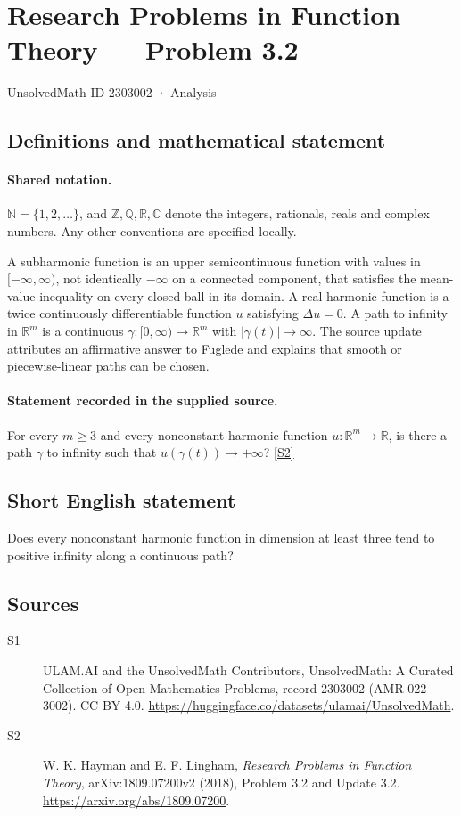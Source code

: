 \documentclass[11pt]{article}
\newcommand{\sref}[2]{\hyperlink{source:#1:#2}{[S#2]}}
\begin{document}
\setcounter{section}{2303001}
\section{Research Problems in Function Theory — Problem 3.2}\label{2303002}
{\small\sffamily UnsolvedMath ID 2303002 · Analysis}
\subsection{Definitions and mathematical statement}

\paragraph{Shared notation.}$\mathbb N=\{1,2,\ldots\}$, and $\mathbb Z,\mathbb Q,\mathbb R,\mathbb C$ denote the integers, rationals, reals and complex numbers. Any other conventions are specified locally.


A subharmonic function is an upper semicontinuous function with values in $[-\infty,\infty)$, not identically $-\infty$ on a connected component, that satisfies the mean-value inequality on every closed ball in its domain. A real harmonic function is a twice continuously differentiable function $u$ satisfying $\Delta u=0$. A path to infinity in $\mathbb R^m$ is a continuous $\gamma:[0,\infty)\to\mathbb R^m$ with $|\gamma(t)|\to\infty$.
The source update attributes an affirmative answer to Fuglede and explains that smooth or piecewise-linear paths can be chosen.
\paragraph{Statement recorded in the supplied source.}
For every $m\geq3$ and every nonconstant harmonic function $u:\mathbb R^m\to\mathbb R$, is there a path $\gamma$ to infinity such that $u(\gamma(t))\to+\infty$? \sref{2303002}{2}
\subsection{Short English statement}
Does every nonconstant harmonic function in dimension at least three tend to positive infinity along a continuous path?
\subsection{Sources}
\begin{description}
\item[\hypertarget{source:2303002:1}{S1}] ULAM.AI and the UnsolvedMath Contributors, UnsolvedMath: A Curated Collection of Open Mathematics Problems, record 2303002 (AMR-022-3002). CC BY 4.0. \url{https://huggingface.co/datasets/ulamai/UnsolvedMath}.
\item[\hypertarget{source:2303002:2}{S2}] W. K. Hayman and E. F. Lingham, \emph{Research Problems in Function Theory}, arXiv:1809.07200v2 (2018), Problem 3.2 and Update 3.2. \url{https://arxiv.org/abs/1809.07200}.
\end{description}
\label{end:2303002}
\end{document}
